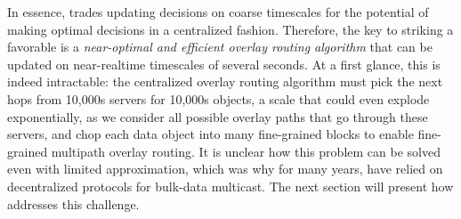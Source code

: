 In essence, \name trades updating decisions on coarse timescales 
for the potential of making optimal decisions in a centralized
fashion. 
Therefore, the key to striking a favorable is a
{\em near-optimal and efficient overlay routing
algorithm} that can be updated on near-realtime timescales of 
several seconds.
At a first glance, this is indeed intractable:
the centralized overlay routing algorithm must pick the next hops
from 10,000s servers for 10,000s objects, a scale that could
even explode exponentially, as we consider all possible
overlay paths that go through these servers, and chop each data
object into many fine-grained blocks to enable fine-grained
multipath overlay routing.
It is unclear how this problem can be solved even with
limited approximation, which was why for many years, \company have
relied on decentralized protocols for bulk-data multicast.
The next section  will present how \name addresses this
challenge.


%
%
%
%
%
%



